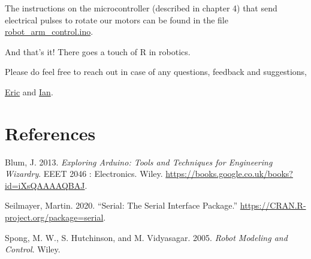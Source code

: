 \documentclass[
  letterpaper,
  DIV=11,
  numbers=noendperiod]{scrreprt}
\newlength{\cslhangindent}
\newlength{\cslentryspacingunit} %
\newenvironment{CSLReferences}[2] %
 {%
  \setlength{\parindent}{0pt}
  \ifodd #1
  \let\oldpar\par
  \def\par{\hangindent=\cslhangindent\oldpar}
  \fi
  \setlength{\parskip}{#2\cslentryspacingunit}
 }%
 {}
\begin{document}
The instructions on the microcontroller (described in chapter 4) that
send electrical pulses to rotate our motors can be found in the file
\href{https://github.com/R-icntay/rstudio_conf22_R_in_robotics/blob/main/arduino_code/robot_arm_control.ino}{robot\_arm\_control.ino}.

And that's it! There goes a touch of R in robotics.

Please do feel free to reach out in case of any questions, feedback and
suggestions,

\href{https://twitter.com/ericntay}{Eric} and
\href{https://twitter.com/Entity_4004}{Ian}.

\hypertarget{references}{%
\chapter*{References}\label{references}}

\hypertarget{refs}{}
\begin{CSLReferences}{1}{0}
\leavevmode{}%
Blum, J. 2013. \emph{Exploring Arduino: Tools and Techniques for
Engineering Wizardry}. EEET 2046 : Electronics. Wiley.
\url{https://books.google.co.uk/books?id=iXsQAAAAQBAJ}.

\leavevmode{}%
Seilmayer, Martin. 2020. {``Serial: The Serial Interface Package.''}
\url{https://CRAN.R-project.org/package=serial}.

\leavevmode{}%
Spong, M. W., S. Hutchinson, and M. Vidyasagar. 2005. \emph{Robot
Modeling and Control}. Wiley.

\end{CSLReferences}
\end{document}
